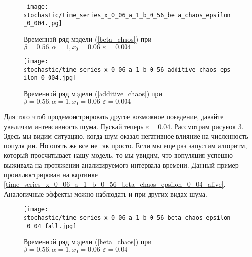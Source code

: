         \begin{figure}
            \centering
            \texttt{[image: stochastic/time\_series\_x\_0\_06\_a\_1\_b\_0\_56\_beta\_chaos\_epsilon\_0\_004.jpg]}
        
            \captionsetup{justification=centering}
            \caption{Временной ряд модели (\ref{beta_chaos}) при \(\beta = 0.56, \alpha = 1, x_0 = 0.06, \varepsilon = 0.004\)}
            \label{time_series_x_0_06_a_1_b_0_56_beta_chaos_epsilon_0_004}
        \end{figure}

        \begin{figure}
            \centering
            \texttt{[image: stochastic/time\_series\_x\_0\_06\_a\_1\_b\_0\_56\_additive\_chaos\_epsilon\_0\_004.jpg]}
        
            \captionsetup{justification=centering}
            \caption{Временной ряд модели (\ref{additive_chaos}) при \(\beta = 0.56, \alpha = 1, x_0 = 0.06, \varepsilon = 0.004\)}
            \label{time_series_x_0_06_a_1_b_0_56_additive_chaos_epsilon_0_004}
        \end{figure}

        Для того чтоб продемонстрировать другое возможное поведение, давайте увеличим интенсивность шума. Пускай теперь \(\varepsilon = 0.04\). Рассмотрим рисунок \ref{time_series_x_0_06_a_1_b_0_56_beta_chaos_epsilon_0_04_fall}. Здесь мы видим ситуацию, когда шум оказал негативное влияние на численность популяции. Но опять же все не так просто. Если мы еще раз запустим алгоритм, который просчитывает нашу модель, то мы увидим, что популяция успешно выживала на протяжении анализируемого интервала времени. Данный пример проиллюстрирован на картинке \ref{time_series_x_0_06_a_1_b_0_56_beta_chaos_epsilon_0_04_alive}. Аналогичные эффекты можно наблюдать и при других видах шума.


        \begin{figure}
            \centering
            \texttt{[image: stochastic/time\_series\_x\_0\_06\_a\_1\_b\_0\_56\_beta\_chaos\_epsilon\_0\_04\_fall.jpg]}
        
            \captionsetup{justification=centering}
            \caption{Временной ряд модели (\ref{beta_chaos}) при \(\beta = 0.56, \alpha = 1, x_0 = 0.06, \varepsilon = 0.04\)}
            \label{time_series_x_0_06_a_1_b_0_56_beta_chaos_epsilon_0_04_fall}
        \end{figure}

